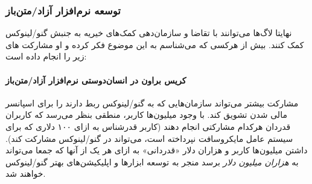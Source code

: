 \subsubsection{توسعه نرم‌افزار آزاد/متن‌باز}

نهایتا لاگ‌ها می‌توانند با تقاضا و سازمان‌دهی کمک‌های خیریه
به جنبش گنو/لینوکس کمک کنند.
بیش از هرکسی که می‌شناسم به این موضوع فکر کرده و او مشارکت
های زیر را انجام داده است:

\paragraph{کریس براون در انسان‌دوستی نرم‌افزار آزاد/متن‌باز}

مشارکت بیشتر می‌تواند سازمان‌هایی که به گنو/لینوکس ربط دارند را
برای اسپانسر مالی شدن تشویق کند. با وجود میلیون‌ها کاربر، منطقی
بنظر می‌رسد که کاربران قدردان هرکدام مشارکتی انجام دهند
(کاربر قدرشناس به ازای ۱۰۰ دلاری که برای سیستم عامل مایکروسافت
نپرداخته است، می‌تواند در گنو/لینوکس مشارکت کند).
داشتن میلیون‌ها کاربر و هزاران دلار «قدردانی» به ازای هر یک از آنها
که جمعا می‌تواند به
{\itshape هزاران میلیون دلار}
برسد منجر به توسعه ابزار‌ها و اپلیکیشن‌های بهتر گنو/لینوکس خواهند شد.


